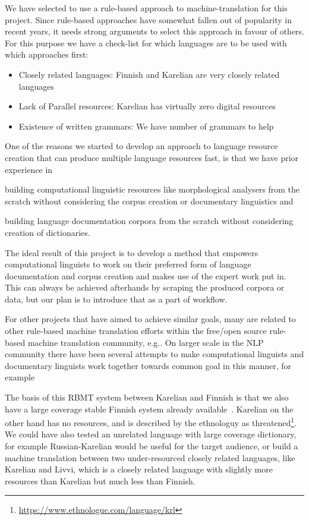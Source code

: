 \documentclass{flammie}
\begin{document}
We have selected to use a rule-based approach to machine-translation for this
project. Since rule-based approaches have somewhat fallen out of popularity in
recent years, it needs strong arguments to select this approach in favour of
others. For this purpose we have a check-list for which languages are to be used
with which approaches first:

\begin{itemize}
    \item Closely related languages: Finnish and Karelian are very closely
        related languages
    \item Lack of Parallel resources: Karelian has virtually zero
        digital resources
    \item Existence of written grammars: We have number of grammars to
        help~\cite{zaikov2013vienankarjalan}
\end{itemize}

One of the reasons we started to develop an approach to language resource
creation that can produce multiple language resources fast, is that we have
prior experience in \begin{enumerate*}
    \item building computational linguistic resources like
morphological analysers from the scratch without considering the corpus creation
or documentary linguistics and
    \item building language documentation corpora from
        the scratch without considering creation of dictionaries.
\end{enumerate*}
The ideal result of this project is to develop a method that empowers
computational linguists to work on their preferred form of language
documentation and corpus creation and makes use of the expert work put in. This
can always be achieved afterhands by scraping the produced corpora or data, but
our plan is to introduce that as a part of workflow.

For other projects that have aimed to achieve similar goals, many are related
to other rule-based machine translation efforts within the free/open source
rule-based machine translation community, e.g.\cite{washington2014finite}.
On larger scale in the NLP community there have been several attempts to
make computational linguists and documentary linguists work together towards
common goal in this manner, for
example~\cite{maxwell2008joint,blokland2015language}

The basis of this RBMT system between Karelian and Finnish is that we also have
a large coverage stable Finnish system already available~\cite{omorfi}.
Karelian on the other hand has no resources, and is described by the ethnologuy
as threatened\footnote{\url{https://www.ethnologue.com/language/krl}}.  We
could have also tested an unrelated language with large coverage dictionary,
for example Russian-Karelian  would be useful for the target audience, or build
a machine translation between two under-resourced closely related languages,
like Karelian and Livvi, which is a closely related language with slightly
more resources than Karelian but much less than Finnish.
\end{document}
